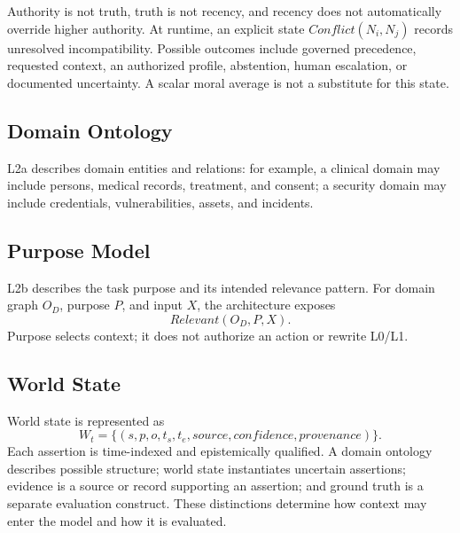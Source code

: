 Authority is not truth, truth is not recency, and recency does not automatically override higher authority. At runtime, an explicit state $\mathit{Conflict}(N_i,N_j)$ records unresolved incompatibility. Possible outcomes include governed precedence, requested context, an authorized profile, abstention, human escalation, or documented uncertainty. A scalar moral average is not a substitute for this state.



\subsection{Domain Ontology}

L2a describes domain entities and relations: for example, a clinical domain may include persons, medical records, treatment, and consent; a security domain may include credentials, vulnerabilities, assets, and incidents.

\subsection{Purpose Model}

L2b describes the task purpose and its intended relevance pattern. For domain graph $O_D$, purpose $P$, and input $X$, the architecture exposes
\[
  \mathit{Relevant}(O_D,P,X).
\]
Purpose selects context; it does not authorize an action or rewrite L0/L1.

\subsection{World State}

World state is represented as
\[
  W_t = \{(s,p,o,t_s,t_e,\mathit{source},\mathit{confidence},\mathit{provenance})\}.
\]
Each assertion is time-indexed and epistemically qualified. A domain ontology describes possible structure; world state instantiates uncertain assertions; evidence is a source or record supporting an assertion; and ground truth is a separate evaluation construct. These distinctions determine how context may enter the model and how it is evaluated.

